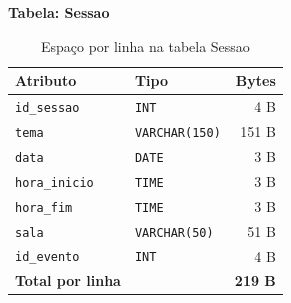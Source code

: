 \documentclass[runningheads]{llncs}
\begin{document}
                \vspace{0.4cm}
                \noindent\begin{minipage}{\textwidth}
                \noindent\textbf{Tabela: Sessao}\\[0.2cm]

                \begin{table}[H]
                \centering
                \renewcommand{\arraystretch}{1.3}
                \begin{tabular}{|l|l|r|}
                \hline
                \textbf{Atributo} & \textbf{Tipo} & \textbf{Bytes} \\ \hline
                \texttt{id\_sessao}    & \texttt{INT}          & 4 B \\ \hline
                \texttt{tema}          & \texttt{VARCHAR(150)} & 151 B \\ \hline
                \texttt{data}          & \texttt{DATE}         & 3 B \\ \hline
                \texttt{hora\_inicio}  & \texttt{TIME}         & 3 B \\ \hline
                \texttt{hora\_fim}     & \texttt{TIME}         & 3 B \\ \hline
                \texttt{sala}          & \texttt{VARCHAR(50)}  & 51 B \\ \hline
                \texttt{id\_evento}    & \texttt{INT}          & 4 B \\ \hline
                \textbf{Total por linha} & & \textbf{219 B} \\ \hline
                \end{tabular}
                \vspace{0.2cm}
                \caption{Espaço por linha na tabela Sessao} \label{tab:bytes_sessao}
                \end{table}
                \end{minipage}
\end{document}
